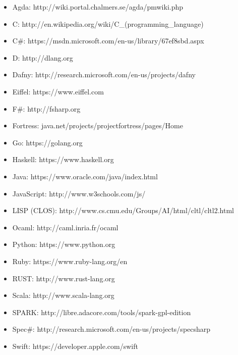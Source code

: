 \begin{itemize}
\item Agda: http://wiki.portal.chalmers.se/agda/pmwiki.php
\item C: http://en.wikipedia.org/wiki/C\_(programming\_language)
\item C\#: https://msdn.microsoft.com/en-us/library/67ef8sbd.aspx
\item D: http://dlang.org
\item Dafny: http://research.microsoft.com/en-us/projects/dafny
\item Eiffel: https://www.eiffel.com
\item F\#: http://fsharp.org
\item Fortress: java.net/projects/projectfortress/pages/Home
\item Go: https://golang.org
\item Haskell: https://www.haskell.org
\item Java: https://www.oracle.com/java/index.html
\item JavaScript: http://www.w3schools.com/js/
\item LISP (CLOS): http://www.cs.cmu.edu/Groups/AI/html/cltl/cltl2.html
\item Ocaml: http://caml.inria.fr/ocaml
\item Python: https://www.python.org
\item Ruby: https://www.ruby-lang.org/en
\item RUST: http://www.rust-lang.org
\item Scala: http://www.scala-lang.org
\item SPARK: http://libre.adacore.com/tools/spark-gpl-edition
\item Spec\#: http://research.microsoft.com/en-us/projects/specsharp
\item Swift: https://developer.apple.com/swift
\end{itemize}